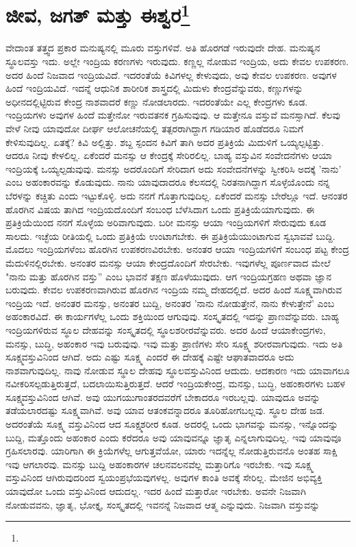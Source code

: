 
\chapter[ಜೀವ, ಜಗತ್ ಮತ್ತು ಈಶ್ವರ]{ಜೀವ, ಜಗತ್ ಮತ್ತು ಈಶ್ವರ\protect\footnote{}}

ವೇದಾಂತ ತತ್ತ್ವದ ಪ್ರಕಾರ ಮನುಷ್ಯನಲ್ಲಿ ಮೂರು ವಸ್ತುಗಳಿವೆ. ಅತಿ ಹೊರಗಡೆ ಇರುವುದೇ ದೇಹ. ಮನುಷ್ಯನ ಸ್ಥೂಲವಸ್ತು ಇದು. ಅಲ್ಲೇ ಇಂದ್ರಿಯ ಕರಣಗಳು ಇರುವುದು. ಕಣ್ಣಲ್ಲ ನೋಡುವ ಇಂದ್ರಿಯ, ಅದು ಕೇವಲ ಉಪಕರಣ. ಅದರ ಹಿಂದೆ ನಿಜವಾದ ಇಂದ್ರಿಯವಿದೆ. ಇದರಂತೆಯೆ ಕಿವಿಗಳಲ್ಲ ಕೇಳುವುದು, ಅವು ಕೇವಲ ಉಪಕರಣ. ಅವುಗಳ ಹಿಂದೆ ಇಂದ್ರಿಯವಿದೆ. ಇದನ್ನೆ ಆಧುನಿಕ ಶಾರೀರಿಕ ಶಾಸ್ತ್ರದಲ್ಲಿ ಮಿದುಳು ಕೇಂದ್ರವೆನ್ನುವರು, ಕಣ್ಣುಗಳನ್ನು ಅಧೀನದಲ್ಲಿಟ್ಟಿರುವ ಕೇಂದ್ರ ನಾಶವಾದರೆ ಕಣ್ಣು ನೋಡಲಾರದು. ಇದರಂತೆಯೇ ಎಲ್ಲ ಕೇಂದ್ರಗಳು ಕೂಡ. ಇಂದ್ರಿಯಗಳು ಅವುಗಳ ಹಿಂದೆ ಮತ್ತೇನೋ ಇರುವತನಕ ಗ್ರಹಿಸುವುವು. ಆ ಮತ್ತೇನೂ ವಸ್ತುವೆ ಮನಸ್ಸಾಗಿದೆ. ಕೆಲವು ವೇಳೆ ನೀವು ಯಾವುದೋ ದೀರ್ಘ ಆಲೋಚನೆಯಲ್ಲಿ ತತ್ಪರರಾಗಿದ್ದಾಗ ಗಡಿಯಾರ ಹೊಡೆದರೂ ನಿಮಗೆ ಕೇಳಿಸುವುದಿಲ್ಲ. ಏತಕ್ಕೆ? ಕಿವಿ ಅಲ್ಲಿತ್ತು. ಶಬ್ದ ಸ್ಪಂದನ ಕಿವಿಗೆ ತಾಗಿ ಅದರ ಪ್ರತಿಕ್ರಿಯೆ ಮಿದುಳಿಗೆ ಒಯ್ಯಲ್ಪಟ್ಟಿತ್ತು. ಆದರೂ ನೀವು ಕೇಳಲಿಲ್ಲ. ಏಕೆಂದರೆ ಮನಸ್ಸು ಆ ಕೇಂದ್ರಕ್ಕೆ ಸೇರಿರಲಿಲ್ಲ. ಬಾಹ್ಯ ವಸ್ತುವಿನ ಸಂವೇದನೆಗಳು ಆಯಾ ಇಂದ್ರಿಯಕ್ಕೆ ಒಯ್ಯಲ್ಪಡುವುವು. ಮನಸ್ಸು ಅದರೊಂದಿಗೆ ಸೇರಿದಾಗ ಅದು ಸಂವೇದನೆಗಳನ್ನು ಸ್ವೀಕರಿಸಿ ಅದಕ್ಕೆ 'ನಾನು' ಎಂಬ ಅಹಂಕಾರವನ್ನು ಕೊಡುವುದು. ನಾನು ಯಾವುದಾದರೂ ಕೆಲಸದಲ್ಲಿ ನಿರತನಾಗಿದ್ದಾಗ ಸೊಳ್ಳೆಯೊಂದು ನನ್ನ ಬೆರಳನ್ನು ಕಚ್ಚಿತು ಎಂದು ಇಟ್ಟುಕೊಳ್ಳಿ. ಅದು ನನಗೆ ಗೊತ್ತಾಗುವುದಿಲ್ಲ. ಏಕೆಂದರೆ ಮನಸ್ಸು ಬೇರೆಲ್ಲೂ ಇದೆ. ಆನಂತರ ಹೊರಗಿನ ವಿಷಯ ತಾಗಿದ ಇಂದ್ರಿಯದೊಂದಿಗೆ ಸಂಬಂಧ ಬೆಳೆಸಿದಾಗ ಒಂದು ಪ್ರತಿಕ್ರಿಯೆಯಾಗುವುದು. ಈ ಪ್ರತಿಕ್ರಿಯೆಯಿಂದ ನನಗೆ ಸೊಳ್ಳೆಯ ಅರಿವಾಗುವುದು. ಬರೀ ಮನಸ್ಸು ಆಯಾ ಇಂದ್ರಿಯಗಳಿಗೆ ಸೇರುವುದು ಕೂಡ ಸಾಲದು. ಇಚ್ಛೆಯ ರೀತಿಯಲ್ಲಿ ಒಂದು ಪ್ರತಿಕ್ರಿಯೆ ಉಂಟಾಗಬೇಕು. ಈ ಪ್ರತಿಕ್ರಿಯೆಯುಂಟಾಗುವ ಸ್ವಭಾವವೆ ಬುದ್ದಿ. ಮೊದಲು ಇಂದ್ರಿಯಗಳೆಂಬ ಹೊರಗಿನ ಉಪಕರಣವಿರಬೇಕು. ಅನಂತರ ಆಯಾ ಇಂದ್ರಿಯಗಳಿಗೆ ಸಂಬಂಧ ಪಟ್ಟ ಕೇಂದ್ರ ಮೆದುಳಿನಲ್ಲಿರಬೇಕು. ಅನಂತರ ಮನಸ್ಸು ಆಯಾ ಕೇಂದ್ರದೊಂದಿಗೆ ಸೇರಬೇಕು. ಇವುಗಳೆಲ್ಲ ಪೂರ್ಣವಾದ ಮೇಲೆ "ನಾನು ಮತ್ತು ಹೊರಗಿನ ವಸ್ತು” ಎಂಬ ಭಾವನೆ ತಕ್ಷಣ ಹೊಳೆಯುವುದು. ಆಗ ಇಂದ್ರಿಯಗ್ರಹಣ ಅಥವಾ ಜ್ಞಾನ ಬರುವುದು. ಕೇವಲ ಉಪಕರಣವಾಗಿರುವ ಹೊರಗಿನ ಇಂದ್ರಿಯ ನಮ್ಮ ದೇಹದಲ್ಲಿದೆ. ಅದರ ಹಿಂದೆ ಸೂಕ್ಷ್ಮವಾಗಿರುವ ಇಂದ್ರಿಯ ಇದೆ. ಅನಂತರ ಮನಸ್ಸು, ಅನಂತರ ಬುದ್ದಿ, ಅನಂತರ 'ನಾನು ನೋಡುತ್ತೇನೆ, ನಾನು ಕೇಳುತ್ತೇನೆ' ಎಂಬ ಅಹಂಕಾರವಿದೆ. ಈ ಕಾರ್ಯಗಳೆಲ್ಲ ಒಂದು ಶಕ್ತಿಯಿಂದ ಆಗುವುವು. ಸಂಸ್ಕೃತದಲ್ಲಿ ಇದನ್ನು ಪ್ರಾಣವೆನ್ನುವರು. ಬಾಹ್ಯ ಇಂದ್ರಿಯಗಳಿರುವ ಸ್ಥೂಲ ದೇಹವನ್ನು ಸಂಸ್ಕೃತದಲ್ಲಿ ಸ್ಥೂಲಶರೀರವೆನ್ನುವರು. ಅದರ ಹಿಂದೆ ಆಯಾ\break ಕೇಂದ್ರಗಳು, ಮನಸ್ಸು, ಬುದ್ಧಿ, ಅಹಂಕಾರ ಇವು ಬರುವುವು. ಇವು ಮತ್ತು ಪ್ರಾಣಿಗಳು ಸೇರಿ ಸೂಕ್ಷ್ಮ ಶರೀರವಾಗುವುದು. ಇದು ಅತಿ ಸೂಕ್ಷ್ಮವಸ್ತುವಿನಿಂದ ಆಗಿದೆ. ಅದು ಎಷ್ಟು ಸೂಕ್ಷ್ಮ ಎಂದರೆ ಈ ದೇಹಕ್ಕೆ ಎಷ್ಟೇ ಆಘಾತವಾದರೂ ಅದು ನಾಶವಾಗುವುದಿಲ್ಲ. ನಾವು ನೋಡುವ ಸ್ಥೂಲ ದೇಹವು ಸ್ಥೂಲವಸ್ತುವಿನಿಂದ ಆದುದು. ಆದಕಾರಣ ಇದು ಯಾವಾಗಲೂ ನವೀಕರಿಸಲ್ಪಡುತ್ತಿರುತ್ತದೆ, ಬದಲಾಯಿಸುತ್ತಿರುತ್ತದೆ. ಆದರೆ ಇಂದ್ರಿಯಕೇಂದ್ರ, ಮನಸ್ಸು, ಬುದ್ಧಿ, ಅಹಂಕಾರಗಳು ಬಹಳ ಸೂಕ್ಷ್ಮವಸ್ತುವಿನಿಂದ ಆಗಿವೆ. ಅವು ಯುಗಯುಗಾಂತರದವರೆಗೆ ಬೇಕಾದರೂ ಇರಬಲ್ಲವು. ಯಾವುದೂ ಅವನ್ನು ತಡೆಯಲಾರದಷ್ಟು ಸೂಕ್ಷ್ಮವಾಗಿವೆ. ಅವು ಯಾವ ಆತಂಕವನ್ನಾದರೂ ತೂರಿಹೋಗಬಲ್ಲವು. ಸ್ಥೂಲ ದೇಹ ಜಡ. ಅದರಂತೆಯೆ ಸೂಕ್ಷ್ಮ ವಸ್ತುವಿನಿಂದ ಆದ ಸೂಕ್ಷ್ಮಶರೀರ ಕೂಡ. ಅದರಲ್ಲಿ ಒಂದು ಭಾಗವನ್ನು ಮನಸ್ಸು, ಇನ್ನೊಂದನ್ನು ಬುದ್ದಿ, ಮತ್ತೊಂದು ಅಹಂಕಾರ ಎಂದು ಕರೆದರೂ ಅವು ಯಾವುವನ್ನೂ ಜ್ಞಾತೃ ಎನ್ನಲಾಗುವುದಿಲ್ಲ. ಇವು ಯಾವುವೂ ಗ್ರಹಿಸಲಾರವು. ಯಾರಿಗಾಗಿ ಈ ಕ್ರಿಯೆಗಳೆಲ್ಲ ಆಗುತ್ತವೆಯೋ, ಯಾರು ಇದನ್ನೆಲ್ಲ ನೋಡುತ್ತಿರುವನೊ ಅಂತಹ ಸಾಕ್ಷಿ ಇವು ಆಗಲಾರವು. ಮನಸ್ಸು ಬುದ್ದಿ ಅಹಂಕಾರಗಳ ಚಲನವಲನವೆಲ್ಲ ಮತ್ತಾರಿಗೊ ಇರಬೇಕು. ಇವು ಸೂಕ್ಷ್ಮ ವಸ್ತುವಿನಿಂದ ಆಗಿರುವುದರಿಂದ ಸ್ವಯಂಪ್ರಭೆಯವುಗಳಲ್ಲ. ಅವುಗಳ ಕಾಂತಿ ಅವಕ್ಕೆ ಸೇರಿಲ್ಲ. ಮೇಜಿನ ಅಭಿವ್ಯಕ್ತಿ ಯಾವುದೋ ಒಂದು ವಸ್ತುವಿನಿಂದ ಆದುದಲ್ಲ. ಇದರ ಹಿಂದೆ ಮತ್ತಾರೋ ಇರಬೇಕು. ಅವನೇ ನಿಜವಾಗಿ ನೋಡುವವನು, ಜ್ಞಾತೃ, ಭೋಕ್ತೃ, ಸಂಸ್ಕೃತದಲ್ಲಿ ಇವನನ್ನೆ ನಿಜವಾದ ಆತ್ಮ ಎನ್ನುವುದು. ನಿಜವಾಗಿ ವಸ್ತುವನ್ನು 